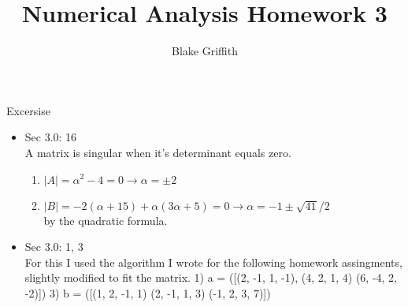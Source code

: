 \documentclass[a4paper]{article}
\title{Numerical Analysis Homework 3}
\author{Blake Griffith}
\begin{document}
\maketitle
\begin{section}{Excersise}
	\begin{itemize}
		\item{Sec 3.0: 16}\\
			A matrix is singular when it's determinant equals zero.
			\begin{enumerate}
				\item \( |A| = \alpha^2 - 4 = 0 \rightarrow \alpha = \pm 2 \)
				\item \( |B| = -2( \alpha + 15) + \alpha ( 3\alpha + 5) = 0 \rightarrow \alpha = - 1 \pm \sqrt{41} / 2 \)\\
					by the quadratic formula.
			\end{enumerate}
		\item{Sec 3.0: 1, 3}\\ 
			For this I used the algorithm I wrote for the following homework assingments, slightly modified to fit the matrix.
1) a = ([(2, -1, 1, -1),
	(4, 2, 1, 4)
	(6, -4, 2, -2)])
3) b = ([(1, 2, -1, 1)
	(2, -1, 1, 3)
	(-1, 2, 3, 7)])
	\end{itemize}
\end{section}
\end{document}
